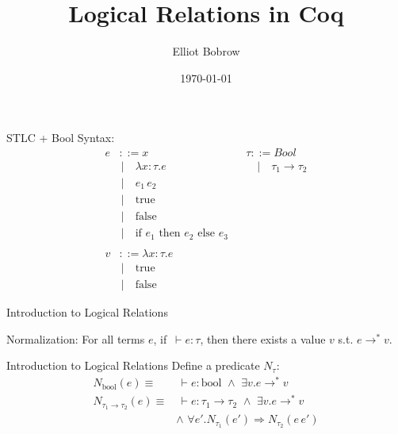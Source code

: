 \documentclass{beamer}
\title{Logical Relations in Coq}
\author{Elliot Bobrow}
\institute{UPenn REPL}
\date{\today}
\begin{document}
\begin{frame}
\titlepage
\end{frame}

\begin{frame}{STLC + Bool}
    Syntax:
    \begin{align*}
        e &::= x && \tau ::= Bool \\
        &\,| \quad \lambda x:\tau . e && \quad| \quad \tau_1 \rightarrow \tau_2 \\
        &\,| \quad e_1\,e_2 \\
        &\,| \quad \text{true} \\
        &\,| \quad \text{false} \\
        &\,| \quad \text{if $e_1$ then $e_2$ else $e_3$} \\
        \\
        v &::= \lambda x:\tau . e \\
        &\,| \quad \text{true} \\
        &\,| \quad \text{false}
    \end{align*}
\end{frame}

\begin{frame}{Introduction to Logical Relations}
    \begin{theorem}
        Normalization: For all terms $e$, if $\,\vdash e : \tau$, then there exists a value $v$ s.t. $e\rightarrow^* v$.
    \end{theorem}
\end{frame}

\begin{frame}{Introduction to Logical Relations}
    Define a predicate $N_\tau$:
    \pause
    \begin{align*}
        N_{\text{bool}}(e) \equiv &\,\vdash e:\text{bool} \,\,\wedge\,\, \exists v . e \rightarrow^* v \\[2ex]
        N_{\tau_1\rightarrow\tau_2}(e) \equiv &\,\vdash e: \tau_1\rightarrow\tau_2 \,\,\wedge\,\, \exists v . e \rightarrow^* v \\[1ex]
        &\wedge\,\, \forall e'. N_{\tau_1}(e') \Rightarrow N_{\tau_2}(e\, e')
    \end{align*}
\end{frame}
\end{document}
